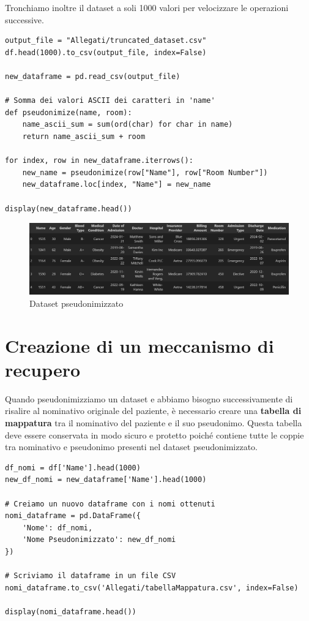 Tronchiamo inoltre il dataset a soli 1000 valori per velocizzare le operazioni successive. \\


\begin{lstlisting}[caption={Visualizzazione dataset}]
output_file = "Allegati/truncated_dataset.csv"
df.head(1000).to_csv(output_file, index=False) 

new_dataframe = pd.read_csv(output_file)

# Somma dei valori ASCII dei caratteri in 'name'
def pseudonimize(name, room):
    name_ascii_sum = sum(ord(char) for char in name) 
    return name_ascii_sum + room
    
for index, row in new_dataframe.iterrows():
    new_name = pseudonimize(row["Name"], row["Room Number"])
    new_dataframe.loc[index, "Name"] = new_name

display(new_dataframe.head())
\end{lstlisting}

\begin{figure}[H]
    \centering
    \includegraphics[width=0.95\linewidth]{Images/Img2.png}
    \caption{Dataset pseudonimizzato}
\end{figure}

\section{Creazione di un meccanismo di recupero}

Quando pseudonimizziamo un dataset e abbiamo bisogno successivamente di risalire al nominativo originale del paziente, è necessario creare una \textbf{tabella di mappatura} tra il nominativo del paziente e il suo pseudonimo. Questa tabella deve essere conservata in modo sicuro e protetto poiché contiene tutte le coppie tra nominativo e pseudonimo presenti nel dataset pseudonimizzato.\\

\begin{lstlisting}[caption={Creazione Tabella di Mappatura}]
df_nomi = df['Name'].head(1000)
new_df_nomi = new_dataframe['Name'].head(1000)

# Creiamo un nuovo dataframe con i nomi ottenuti
nomi_dataframe = pd.DataFrame({
    'Nome': df_nomi,
    'Nome Pseudonimizzato': new_df_nomi
})

# Scriviamo il dataframe in un file CSV
nomi_dataframe.to_csv('Allegati/tabellaMappatura.csv', index=False)

display(nomi_dataframe.head())
\end{lstlisting}

